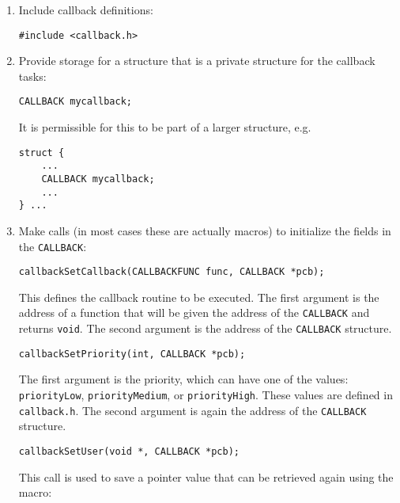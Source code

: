 \begin{enumerate}
\item Include callback definitions:

\begin{verbatim}
#include <callback.h>
\end{verbatim}

\item Provide storage for a structure that is a private structure for the callback tasks:

\begin{verbatim}
CALLBACK mycallback;
\end{verbatim}

It is permissible for this to be part of a larger structure, e.g.

\begin{verbatim}
struct {
    ...
    CALLBACK mycallback;
    ...
} ...
\end{verbatim}

\item Make calls (in most cases these are actually macros) to initialize the fields in the \verb|CALLBACK|:

\begin{verbatim}
callbackSetCallback(CALLBACKFUNC func, CALLBACK *pcb);
\end{verbatim}

This defines the callback routine to be executed. The first argument is the address of a function that will be given the address of the \verb|CALLBACK| and returns \verb|void|. The second argument is the address of the \verb|CALLBACK| structure.

\begin{verbatim}
callbackSetPriority(int, CALLBACK *pcb);
\end{verbatim}

The first argument is the priority, which can have one of the values: \verb|priorityLow|, \verb|priorityMedium|, or 
\verb|priorityHigh|. These values are defined in \verb|callback.h|. The second argument is again the address of the 
\verb|CALLBACK| structure.

\begin{verbatim}
callbackSetUser(void *, CALLBACK *pcb);
\end{verbatim}

This call is used to save a pointer value that can be retrieved again using the macro:


\end{enumerate}
